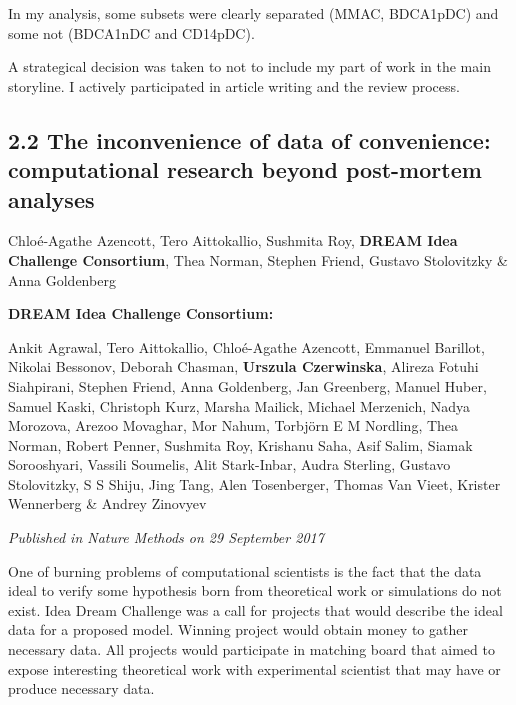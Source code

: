 \documentclass[12pt,]{book}
\theoremstyle{definition}
\theoremstyle{definition}
\theoremstyle{definition}
\theoremstyle{remark}
\begin{document}
In my analysis, some subsets were clearly separated (MMAC, BDCA1pDC) and
some not (BDCA1nDC and CD14pDC).

A strategical decision was taken to not to include my part of work in
the main storyline. I actively participated in article writing and the
review process.



\newpage

\hypertarget{the-inconvenience-of-data-of-convenience-computational-research-beyond-post-mortem-analyses}{%
\subsection*{2.2 The inconvenience of data of convenience: computational
research beyond post-mortem
analyses}\label{the-inconvenience-of-data-of-convenience-computational-research-beyond-post-mortem-analyses}}

Chloé-Agathe Azencott, Tero Aittokallio, Sushmita Roy, \textbf{DREAM
Idea Challenge Consortium}, Thea Norman, Stephen Friend, Gustavo
Stolovitzky \& Anna Goldenberg

\textbf{DREAM Idea Challenge Consortium:}

Ankit Agrawal, Tero Aittokallio, Chloé-Agathe Azencott, Emmanuel
Barillot, Nikolai Bessonov, Deborah Chasman, \textbf{Urszula
Czerwinska}, Alireza Fotuhi Siahpirani, Stephen Friend, Anna Goldenberg,
Jan Greenberg, Manuel Huber, Samuel Kaski, Christoph Kurz, Marsha
Mailick, Michael Merzenich, Nadya Morozova, Arezoo Movaghar, Mor Nahum,
Torbjörn E M Nordling, Thea Norman, Robert Penner, Sushmita Roy,
Krishanu Saha, Asif Salim, Siamak Sorooshyari, Vassili Soumelis, Alit
Stark-Inbar, Audra Sterling, Gustavo Stolovitzky, S S Shiju, Jing Tang,
Alen Tosenberger, Thomas Van Vieet, Krister Wennerberg \& Andrey
Zinovyev

\emph{Published in Nature Methods on 29 September 2017}

One of burning problems of computational scientists is the fact that the
data ideal to verify some hypothesis born from theoretical work or
simulations do not exist. Idea Dream Challenge was a call for projects
that would describe the ideal data for a proposed model. Winning project
would obtain money to gather necessary data. All projects would
participate in matching board that aimed to expose interesting
theoretical work with experimental scientist that may have or produce
necessary data.
\end{document}
